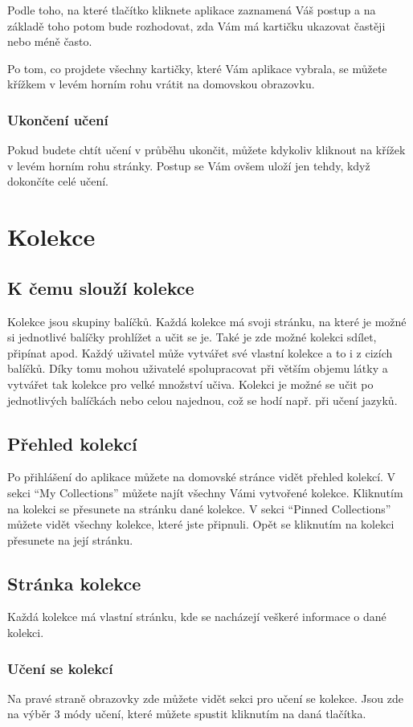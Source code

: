 \documentclass[a4paper,12pt]{article}
\begin{document}
Podle toho, na které tlačítko kliknete aplikace zaznamená Váš postup a na základě toho potom bude rozhodovat, zda Vám má kartičku ukazovat častěji nebo méně často.

Po tom, co projdete všechny kartičky, které Vám aplikace vybrala, se můžete křížkem v levém horním rohu vrátit na domovskou obrazovku.

\subsubsection*{Ukončení učení}
Pokud budete chtít učení v průběhu ukončit, můžete kdykoliv kliknout na křížek v levém horním rohu stránky. Postup se Vám ovšem uloží jen tehdy, když dokončíte celé učení.

\section{Kolekce}
\subsection{K čemu slouží kolekce}
Kolekce jsou skupiny balíčků. Každá kolekce má svoji stránku, na které je možné si jednotlivé balíčky prohlížet a učit se je. Také je zde možné kolekci sdílet, připínat apod. Každý uživatel může vytvářet své vlastní kolekce a to i z cizích balíčků. Díky tomu mohou uživatelé spolupracovat při větším objemu látky a vytvářet tak kolekce pro velké množství učiva. Kolekci je možné se učit po jednotlivých balíčkách nebo celou najednou, což se hodí např. při učení jazyků.

\subsection{Přehled kolekcí}
Po přihlášení do aplikace můžete na domovské stránce vidět přehled kolekcí. V sekci \enquote{My Collections} můžete najít všechny Vámi vytvořené kolekce. Kliknutím na kolekci se přesunete na stránku dané kolekce. V sekci \enquote{Pinned Collections} můžete vidět všechny kolekce, které jste připnuli. Opět se kliknutím na kolekci přesunete na její stránku.

\subsection{Stránka kolekce}
Každá kolekce má vlastní stránku, kde se nacházejí veškeré informace o dané kolekci.

\subsubsection*{Učení se kolekcí}
Na pravé straně obrazovky zde můžete vidět sekci pro učení se kolekce. Jsou zde na výběr 3 módy učení, které můžete spustit kliknutím na daná tlačítka.
\end{document}
